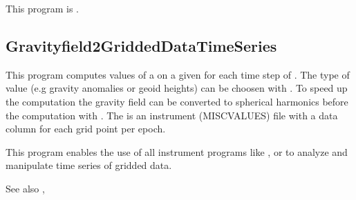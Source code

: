 This program is .
\clearpage
\subsection{Gravityfield2GriddedDataTimeSeries}\label{Gravityfield2GriddedDataTimeSeries}
This program computes values of a  on a given 
for each time step of .
The type of value (e.g gravity anomalies or geoid heights) can be choosen with .
To speed up the computation the gravity field can be converted to spherical harmonics before the computation
with .
The  is an instrument (MISCVALUES) file with a data column
for each grid point per epoch.

This program enables the use of all instrument programs like ,
 or  to analyze and manipulate time series of gridded data.

See also , 


